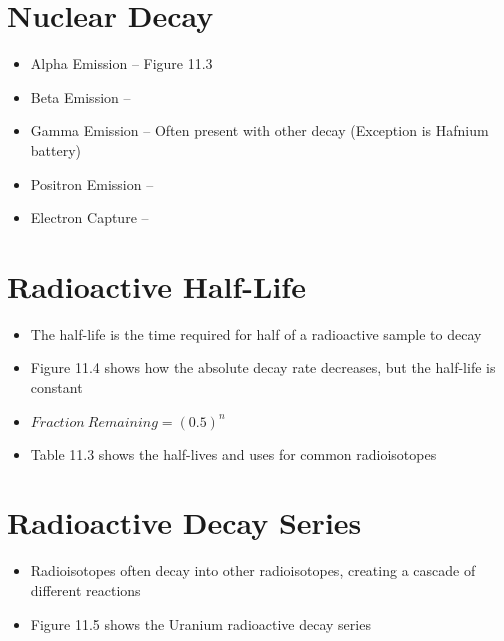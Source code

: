 \documentclass[12pt, openany, letterpaper]{memoir}
\begin{document}
\section{Nuclear Decay}
\begin{itemize}
	\item Alpha Emission -- Figure 11.3


	\item Beta Emission -- ~~ 


	\item Gamma Emission -- Often present with other decay (Exception is Hafnium battery)

	\item Positron Emission -- ~~ 

	\item Electron Capture -- ~~ 

\end{itemize}
\section{Radioactive Half-Life}
\begin{itemize}
	\item The half-life is the time required for half of a radioactive sample to decay
	\item Figure 11.4 shows how the absolute decay rate decreases, but the half-life is constant
	\item $Fraction~Remaining = \left(0.5\right)^{n}$
	\item Table 11.3 shows the half-lives and uses for common radioisotopes
\end{itemize}
\section{Radioactive Decay Series}
\begin{itemize}
	\item Radioisotopes often decay into other radioisotopes, creating a cascade of different reactions
	\item Figure 11.5 shows the Uranium radioactive decay series
\end{itemize}
\end{document}
